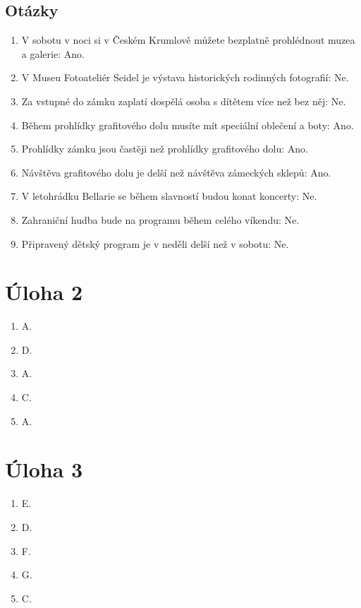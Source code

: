 \documentclass[12pt]{book}
\begin{document}
\subsection{Otázky}
\begin{enumerate}
    \item V sobotu v noci si v Českém Krumlově můžete bezplatně prohlédnout muzea a galerie: Ano.
    \item V Museu Fotoateliér Seidel je výstava historických rodinných fotografií: Ne.
    \item Za vstupné do zámku zaplatí dospělá osoba s dítětem více než bez něj: Ne.
    \item Během prohlídky grafitového dolu musíte mít speciální oblečení a boty: Ano.
    \item Prohlídky zámku jsou častěji než prohlídky grafitového dolu: Ano.
    \item Návštěva grafitového dolu je delší než návštěva zámeckých sklepů: Ano.
    \item V letohrádku Bellarie se během slavností budou konat koncerty: Ne.
    \item Zahraniční hudba bude na programu během celého víkendu: Ne.
    \item Připravený dětský program je v neděli delší než v sobotu: Ne.
\end{enumerate}

\section{Úloha 2}
\begin{enumerate}
    \item A.
    \item D.
    \item A.
    \item C.
    \item A.
\end{enumerate}

\section{Úloha 3}
\begin{enumerate}
    \item E.
    \item D.
    \item F.
    \item G.
    \item C.
\end{enumerate}
\end{document}
